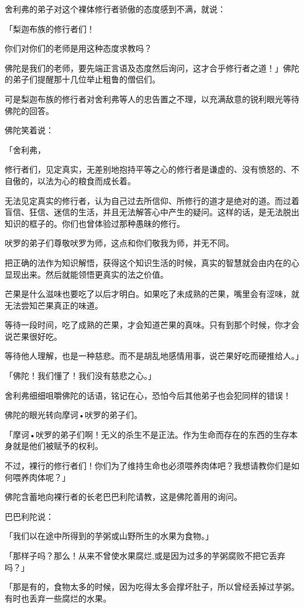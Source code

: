 \documentclass[twoside,openany]{book}
\begin{document}
舍利弗的弟子对这个裸体修行者骄傲的态度感到不满，就说：

「梨迦布族的修行者们！

你们对你们的老师是用这种态度求教吗？

佛陀是我们的老师，要先端正言语及态度然后询问，这才合乎修行者之道！」佛陀的弟子们提醒那十几位举止粗鲁的僧侣们。

可是梨迦布族的修行者对舍利弗等人的忠告置之不理，以充满敌意的锐利眼光等待佛陀的回答。

佛陀笑着说：

「舍利弗，

修行者们，见定真实，无差别地抱持平等之心的修行者是谦虚的、没有愤怒的、不自傲的，以法为心的粮食而成长着。

无法见定真实的修行者，认为自己过去所信仰、所修行的道才是绝对的道。而过着盲信、狂信、迷信的生活，并且无法解答心中产生的疑问。这样的话，是无法脱出知识的框子的。你们也曾体验过那种愚昧的修行。

吠罗的弟子们尊敬吠罗为师，这点和你们敬我为师，并无不同。

把正确的法作为知识解悟，获得这个知识生活的时候，真实的智慧就会由内在的心显现出来。然后就能领悟更真实的法之价值。

芒果是什么滋味也要吃了以后才明白。如果吃了未成熟的芒果，嘴里会有涩味，就无法尝知芒果真正的味道。

等待一段时间，吃了成熟的芒果，才会知道芒果的真味。只有到那个时候，你才会说芒果很好吃。

等待他人理解，也是一种慈悲。而不是胡乱地感情用事，说芒果好吃而硬推给人。」

「佛陀！我们懂了！我们没有慈悲之心。」

舍利弗细细咀嚼佛陀的话语，铭记在心，恐怕今后其他弟子也会犯同样的错误！

佛陀的眼光转向摩诃•吠罗的弟子们。

「摩诃•吠罗的弟子们啊！无义的杀生不是正法。作为生命而存在的东西的生存本身就是他们被赋予的权利。

不过，裸行的修行者们！你们为了维持生命也必须喂养肉体吧？我想请教你们是如何喂养肉体呢？」

佛陀含蓄地向裸行者的长老巴巴利陀请教，这是佛陀善用的询问。

巴巴利陀说：

「我们以在途中所得到的芋粥或山野所生的水果为食物。」

「那样子吗？那么！从来不曾使水果腐烂,或是因为过多的芋粥腐败不把它丢弃吗？」

「那是有的，食物太多的时候，因为吃得太多会撑坏肚子，所以曾经丢掉过芋粥。有时也丢弃一些腐烂的水果。
\end{document}
